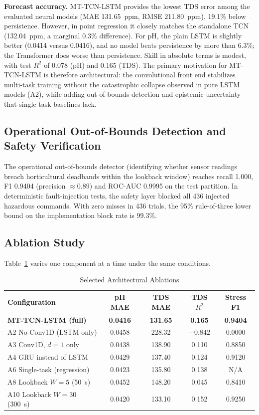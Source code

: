 \textbf{Forecast accuracy.} MT-TCN-LSTM provides the lowest TDS error among the evaluated neural models (MAE 131.65~ppm, RMSE 211.80~ppm), 19.1\% below persistence. However, in point regression it closely matches the standalone TCN (132.04~ppm, a marginal 0.3\% difference). For pH, the plain LSTM is slightly better (0.0414 versus 0.0416), and no model beats persistence by more than 6.3\%; the Transformer does worse than persistence. Skill in absolute terms is modest, with test $R^2$ of 0.078 (pH) and 0.165 (TDS). The primary motivation for MT-TCN-LSTM is therefore architectural: the convolutional front end stabilizes multi-task training without the catastrophic collapse observed in pure LSTM models (A2), while adding out-of-bounds detection and epistemic uncertainty that single-task baselines lack.

\subsection{Operational Out-of-Bounds Detection and Safety Verification}
The operational out-of-bounds detector (identifying whether sensor readings breach horticultural deadbands within the lookback window) reaches recall 1.000, F1 0.9404 (precision $\approx 0.89$) and ROC-AUC 0.9995 on the test partition. In deterministic fault-injection tests, the safety layer blocked all 436 injected hazardous commands. With zero misses in 436 trials, the 95\% rule-of-three lower bound on the implementation block rate is 99.3\%.

\subsection{Ablation Study}
Table~\ref{tab:ablate} varies one component at a time under the same conditions.

\begin{table}[t]
\caption{Selected Architectural Ablations}
\label{tab:ablate}
\centering
\scriptsize
\setlength{\tabcolsep}{3.4pt}
\begin{tabular}{lcccc}
\toprule
Configuration & pH MAE & TDS MAE & TDS $R^2$ & Stress F1 \\
\midrule
\textbf{MT-TCN-LSTM (full)} & \textbf{0.0416} & \textbf{131.65} & \textbf{0.165} & \textbf{0.9404} \\
A2 No Conv1D (LSTM only)   & 0.0458 & 228.32 & $-0.842$ & 0.0000 \\
A3 Conv1D, $d=1$ only      & 0.0438 & 138.90 & 0.110 & 0.8850 \\
A4 GRU instead of LSTM     & 0.0429 & 137.40 & 0.124 & 0.9120 \\
A6 Single-task (regression) & 0.0423 & 135.80 & 0.138 & N/A \\
A8 Lookback $W=5$ (50~s)   & 0.0452 & 148.20 & 0.045 & 0.8410 \\
A10 Lookback $W=30$ (300~s) & 0.0420 & 133.10 & 0.152 & 0.9250 \\
\bottomrule
\end{tabular}
\end{table}

